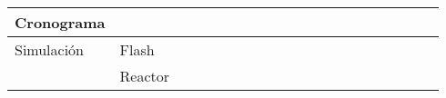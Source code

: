 \begin{table}[H]
\begin{turn}{90}
\begin{tabular}{@{}llllllllllllllllllll@{}}
\multicolumn{1}{l|}{Cronograma}                                                        & \multicolumn{1}{l|}{}                                                                   & \multicolumn{1}{l|}{}                         &                                                 &                          &                          & \multicolumn{1}{l|}{}                         &                          &                          &                          & \cellcolor[HTML]{000000} & \multicolumn{1}{l|}{}                         &                          &                          &                          & \multicolumn{1}{l|}{}                         &                                               &                          &                          &                          \\ \midrule
\multicolumn{1}{l|}{Simulación}                                                        & \multicolumn{1}{l|}{Flash}                                                              & \multicolumn{1}{l|}{}                         &                                                 &                          &                          & \multicolumn{1}{l|}{}                         &                          &                          &                          &                          & \multicolumn{1}{l|}{\cellcolor[HTML]{000000}} &                          &                          &                          & \multicolumn{1}{l|}{}                         &                                               &                          &                          &                          \\
\multicolumn{1}{l|}{}                                                                  & \multicolumn{1}{l|}{Reactor}                                                            & \multicolumn{1}{l|}{}                         &                                                 &                          &                          & \multicolumn{1}{l|}{}                         &                          &                          &                          &                          & \multicolumn{1}{l|}{}                         & \cellcolor[HTML]{000000} &                          &                          & \multicolumn{1}{l|}{}                         &                                               &                          &                          &                          \\

\end{tabular}
\end{turn}
\end{table}
